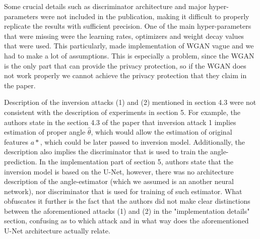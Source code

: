 Some crucial details such as discriminator architecture and major hyper-parameters were not included in the publication, making it difficult to properly replicate the results with sufficient precision. One of the main hyper-parameters that were missing were the learning rates, optimizers and weight decay values that were used. This particularly, made implementation of WGAN vague and we had to make a lot of assumptions. This is especially a problem, since the WGAN is the only part that can provide the privacy protection, so if the WGAN does not work properly we cannot achieve the privacy protection that they claim in the paper.

Description of the inversion attacks (1) and (2) mentioned in section 4.3 were not consistent with the description of experiments in section 5. For example, the authors state in the section 4.3 of the paper that inversion attack 1 implies  estimation of proper angle $\hat{\theta}$, which would allow the estimation of original features $a*$, which could be later passed to inversion model. Additionally, the description also implies the discriminator that is used to train the angle-prediction. In the implementation part of section 5, authors state that the inversion model is based on the U-Net, however, there was no architecture description of the angle-estimator (which we assumed is an another neural network), nor discriminator that is used for training of such estimator. What obfuscates it further is the fact that the authors did not make clear distinctions between the aforementioned attacks (1) and (2) in the "implementation details" section, confusing as to which attack and in what way does the aforementioned U-Net architecture actually relate.




\newpage

